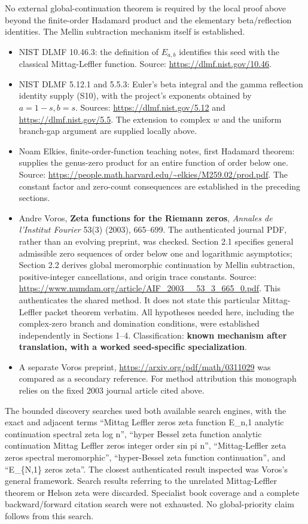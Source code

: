 No external global-continuation theorem is required by the local proof above beyond the
finite-order Hadamard product and the elementary beta/reflection
identities. The Mellin subtraction mechanism itself is established.

\begin{itemize}
\tightlist
\item
  NIST DLMF 10.46.3: the definition of \(E_{a,b}\) identifies this seed
  with the classical Mittag-Leffler function. Source:
  \url{https://dlmf.nist.gov/10.46}.
\item
  NIST DLMF 5.12.1 and 5.5.3: Euler's beta integral and the gamma
  reflection identity supply (S10), with the project's exponents
  obtained by \(a=1-s,b=s\). Sources: \url{https://dlmf.nist.gov/5.12} and
  \url{https://dlmf.nist.gov/5.5}. The extension to complex \(w\) and the
  uniform branch-gap argument are supplied locally above.
\item
  Noam Elkies, finite-order-function teaching notes, first Hadamard
  theorem: supplies the genus-zero product for an entire function of
  order below one. Source:
  \url{https://people.math.harvard.edu/~elkies/M259.02/prod.pdf}.
  The constant factor and zero-count consequences are established in the preceding sections.
\item
  Andre Voros, \textbf{Zeta functions for the Riemann zeros},
  \emph{Annales de l'Institut Fourier} 53(3) (2003), 665--699. The
  authenticated journal PDF, rather than an evolving preprint, was
  checked. Section 2.1 specifies general admissible zero sequences of
  order below one and logarithmic asymptotics; Section 2.2 derives
  global meromorphic continuation by Mellin subtraction,
  positive-integer cancellations, and origin trace constants. Source:
  \url{https://www.numdam.org/article/AIF_2003__53_3_665_0.pdf}. This
  authenticates the shared method. It does not state this particular
  Mittag-Leffler packet theorem verbatim. All hypotheses needed here,
  including the complex-zero branch and domination conditions, were
  established independently in Sections 1--4. Classification:
  \textbf{known mechanism after translation, with a worked seed-specific
  specialization}.
\item
  A separate Voros preprint, \url{https://arxiv.org/pdf/math/0311029} was
  compared as a secondary reference. For method attribution this monograph relies on the fixed 2003 journal article cited above.
\end{itemize}

The bounded discovery searches used both available search engines, with
the exact and adjacent terms ``Mittag Leffler zeros zeta function E\_n,1
analytic continuation spectral zeta log n'', ``hyper Bessel zeta
function analytic continuation Mittag Leffler zeros integer order sin pi
n'', ``Mittag-Leffler zeta zeros spectral meromorphic'', ``hyper-Bessel
zeta function continuation'', and ``E\_\{N,1\} zeros zeta''. The closest
authenticated result inspected was Voros's general framework. Search
results referring to the unrelated Mittag-Leffler theorem or Helson zeta
were discarded. Specialist book coverage and a complete backward/forward
citation search were not exhausted. No global-priority claim follows
from this search.

